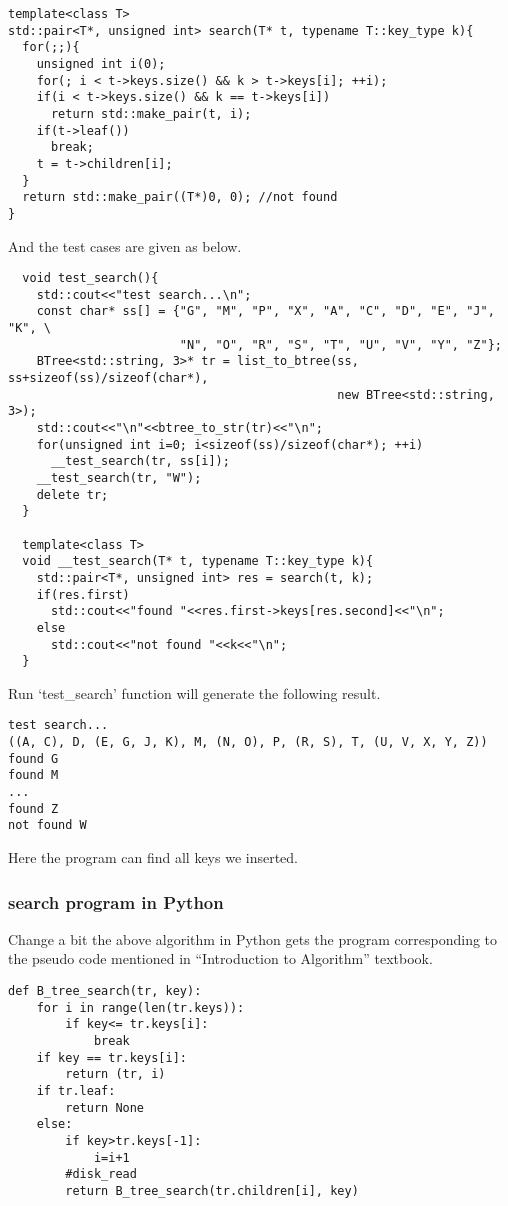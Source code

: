 \documentclass{article}
\begin{document}
\lstset{language=C++}
\begin{lstlisting}
template<class T>
std::pair<T*, unsigned int> search(T* t, typename T::key_type k){
  for(;;){
    unsigned int i(0);
    for(; i < t->keys.size() && k > t->keys[i]; ++i);
    if(i < t->keys.size() && k == t->keys[i])
      return std::make_pair(t, i);
    if(t->leaf())
      break;
    t = t->children[i];
  }
  return std::make_pair((T*)0, 0); //not found
}
\end{lstlisting}

And the test cases are given as below.

\begin{lstlisting}
  void test_search(){
    std::cout<<"test search...\n";
    const char* ss[] = {"G", "M", "P", "X", "A", "C", "D", "E", "J", "K", \
                        "N", "O", "R", "S", "T", "U", "V", "Y", "Z"};
    BTree<std::string, 3>* tr = list_to_btree(ss, ss+sizeof(ss)/sizeof(char*),
                                              new BTree<std::string, 3>);
    std::cout<<"\n"<<btree_to_str(tr)<<"\n";
    for(unsigned int i=0; i<sizeof(ss)/sizeof(char*); ++i)
      __test_search(tr, ss[i]);
    __test_search(tr, "W");
    delete tr;
  }

  template<class T>
  void __test_search(T* t, typename T::key_type k){
    std::pair<T*, unsigned int> res = search(t, k);
    if(res.first)
      std::cout<<"found "<<res.first->keys[res.second]<<"\n";
    else
      std::cout<<"not found "<<k<<"\n";
  }
\end{lstlisting}

Run `test\_search' function will generate the following result.

\begin{verbatim}
test search...
((A, C), D, (E, G, J, K), M, (N, O), P, (R, S), T, (U, V, X, Y, Z))
found G
found M
...
found Z
not found W
\end{verbatim}

Here the program can find all keys we inserted.

\subsubsection*{search program in Python}

Change a bit the above algorithm in Python gets the program corresponding
to the pseudo code mentioned in ``Introduction to Algorithm'' textbook.

\lstset{language=Python}
\begin{lstlisting}
def B_tree_search(tr, key):
    for i in range(len(tr.keys)):
        if key<= tr.keys[i]:
            break
    if key == tr.keys[i]:
        return (tr, i)
    if tr.leaf:
        return None
    else:
        if key>tr.keys[-1]:
            i=i+1
        #disk_read
        return B_tree_search(tr.children[i], key)
\end{lstlisting}
\end{document}
